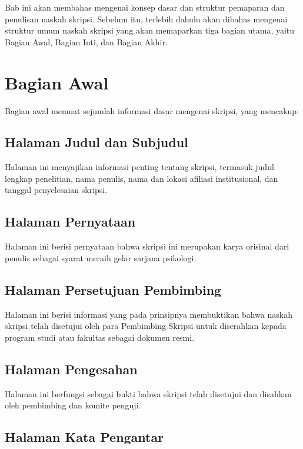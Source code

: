 \documentclass[
  indonesian,
  letterpaper,
]{scrbook}
\begin{document}
Bab ini akan membahas mengenai konsep dasar dan struktur pemaparan dan
penulisan naskah skripsi. Sebelum itu, terlebih dahulu akan dibahas
mengenai struktur umum naskah skripsi yang akan memaparkan tiga bagian
utama, yaitu Bagian Awal, Bagian Inti, dan Bagian Akhir.

\section{Bagian Awal}\label{bagian-awal}

Bagian awal memuat sejumlah informasi dasar mengenai skripsi, yang
mencakup:

\subsection{Halaman Judul dan
Subjudul}\label{halaman-judul-dan-subjudul}

Halaman ini menyajikan informasi penting tentang skripsi, termasuk judul
lengkap penelitian, nama penulis, nama dan lokasi afiliasi
institusional, dan tanggal penyelesaian skripsi.

\subsection{Halaman Pernyataan}\label{halaman-pernyataan}

Halaman ini berisi pernyataan bahwa skripsi ini merupakan karya orisinal
dari penulis sebagai syarat meraih gelar sarjana psikologi.

\subsection{Halaman Persetujuan
Pembimbing}\label{halaman-persetujuan-pembimbing}

Halaman ini berisi informasi yang pada prinsipnya membuktikan bahwa
naskah skripsi telah disetujui oleh para Pembimbing Skripsi untuk
diserahkan kepada program studi atau fakultas sebagai dokumen resmi.

\subsection{Halaman Pengesahan}\label{halaman-pengesahan}

Halaman ini berfungsi sebagai bukti bahwa skripsi telah disetujui dan
disahkan oleh pembimbing dan komite penguji.

\subsection{Halaman Kata Pengantar}\label{halaman-kata-pengantar}
\end{document}
